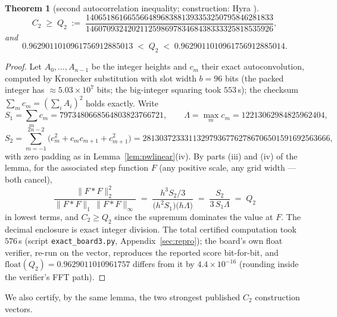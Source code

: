 \documentclass[11pt]{article}
\newtheorem{theorem}{Theorem}
\theoremstyle{remark}
\newcommand{\supnorm}[1]{\lVert #1 \rVert_\infty}
\newcommand{\onenorm}[1]{\lVert #1 \rVert_1}
\newcommand{\twonorm}[1]{\lVert #1 \rVert_2}
\begin{document}
\begin{theorem}[second autocorrelation inequality; construction: Hyra
\cite{Hyra26}]\label{thm:c2}
\[
C_2 \;\ge\; Q_2 \;:=\;
\frac{140651861665566489683881393353250795846281833}
     {146070932420211259869783468438333325818535926},
\]
and
\[
0.9629011010961756912885013 \;<\; Q_2 \;<\; 0.9629011010961756912885014 .
\]
\end{theorem}

\begin{proof}
Let $A_0, \dots, A_{n-1}$ be the integer heights and
$c_m$ their exact autoconvolution, computed by Kronecker substitution with
slot width $b = 96$ bits (the packed integer has $\approx 5.03\times10^{7}$
bits; the big-integer squaring took $553$\,s); the checksum
$\sum_m c_m = (\sum_i A_i)^2$ holds exactly. Write
\[
S_1 = \sum_m c_m = 7973480668564803823766721, \qquad
\Lambda = \max_m c_m = 12213062984825962404,
\]
\[
S_2 = \sum_{m=-1}^{2n-2} \bigl(c_m^2 + c_m c_{m+1} + c_{m+1}^2\bigr)
    = 281303723331132979367762786706501591692563666 ,
\]
with zero padding as in Lemma~\ref{lem:pwlinear}(iv). By parts (iii) and
(iv) of the lemma, for the associated step function $F$ (any positive scale,
any grid width --- both cancel),
\[
\frac{\twonorm{F*F}^2}{\onenorm{F*F}\, \supnorm{F*F}}
\;=\; \frac{h^3 S_2 / 3}{\bigl(h^2 S_1\bigr)\bigl(h \Lambda\bigr)}
\;=\; \frac{S_2}{3\, S_1 \Lambda} \;=\; Q_2
\]
in lowest terms, and $C_2 \ge Q_2$ since the supremum dominates the value at
$F$. The decimal enclosure is exact integer division. The total certified
computation took $576$\,s (script \texttt{exact\_board3.py},
Appendix~\ref{sec:repro}); the board's own float verifier, re-run on the
vector, reproduces the reported score bit-for-bit, and
$\mathrm{float}(Q_2) = 0.9629011010961757$ differs from it by
$4.4\times10^{-16}$ (rounding inside the verifier's FFT path).
\end{proof}

We also certify, by the same lemma, the two strongest published $C_2$
construction vectors.
\end{document}
